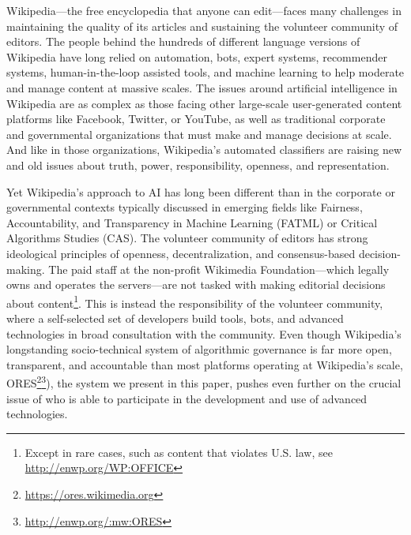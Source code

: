 Wikipedia---the free encyclopedia that anyone can edit---faces many challenges in maintaining the quality of its articles and sustaining the volunteer community of editors. The people behind the hundreds of different language versions of Wikipedia have long relied on automation, bots, expert systems, recommender systems, human-in-the-loop assisted tools, and machine learning to help moderate and manage content at massive scales. The issues around artificial intelligence in Wikipedia are as complex as those facing other large-scale user-generated content platforms like Facebook, Twitter, or YouTube, as well as traditional corporate and governmental organizations that must make and manage decisions at scale. And like in those organizations, Wikipedia's automated classifiers are raising new and old issues about truth, power, responsibility, openness, and representation.

Yet Wikipedia's approach to AI has long been different than in the corporate or governmental contexts typically discussed in emerging fields like Fairness, Accountability, and Transparency in Machine Learning (FATML) or Critical Algorithms Studies (CAS). The volunteer community of editors has strong ideological principles of openness, decentralization, and consensus-based decision-making. The paid staff at the non-profit Wikimedia Foundation---which legally owns and operates the servers---are not tasked with making editorial decisions about content\footnote{Except in rare cases, such as content that violates U.S. law, see \url{http://enwp.org/WP:OFFICE}}. This is instead the responsibility of the volunteer community, where a self-selected set of developers build tools, bots, and advanced technologies in broad consultation with the community. Even though Wikipedia's longstanding socio-technical system of algorithmic governance is far more open, transparent, and accountable than most platforms operating at Wikipedia's scale, ORES\footnote{\url{https://ores.wikimedia.org}}\footnote{\url{http://enwp.org/:mw:ORES}}), the system we present in this paper, pushes even further on the crucial issue of who is able to participate in the development and use of advanced technologies.

